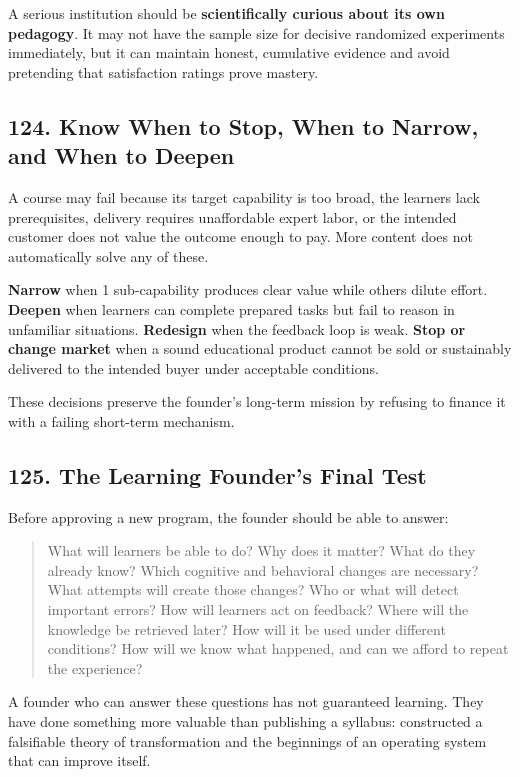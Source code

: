 A serious institution should be \textbf{scientifically curious about its own pedagogy}. It may not have the sample size for decisive randomized experiments immediately, but it can maintain honest, cumulative evidence and avoid pretending that satisfaction ratings prove mastery.

\subsection*{124. Know When to Stop, When to Narrow, and When to Deepen}

A course may fail because its target capability is too broad, the learners lack prerequisites, delivery requires unaffordable expert labor, or the intended customer does not value the outcome enough to pay. More content does not automatically solve any of these.

\textbf{Narrow} when 1 sub-capability produces clear value while others dilute effort. \textbf{Deepen} when learners can complete prepared tasks but fail to reason in unfamiliar situations. \textbf{Redesign} when the feedback loop is weak. \textbf{Stop or change market} when a sound educational product cannot be sold or sustainably delivered to the intended buyer under acceptable conditions.

These decisions preserve the founder's long-term mission by refusing to finance it with a failing short-term mechanism.

\subsection*{125. The Learning Founder's Final Test}

Before approving a new program, the founder should be able to answer:

\begin{quote}
What will learners be able to do? Why does it matter? What do they already know? Which cognitive and behavioral changes are necessary? What attempts will create those changes? Who or what will detect important errors? How will learners act on feedback? Where will the knowledge be retrieved later? How will it be used under different conditions? How will we know what happened, and can we afford to repeat the experience?
\end{quote}

A founder who can answer these questions has not guaranteed learning. They have done something more valuable than publishing a syllabus: constructed a falsifiable theory of transformation and the beginnings of an operating system that can improve itself.
